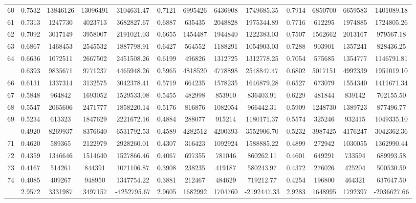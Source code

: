 \documentclass[
  12pt,
]{article}
\begin{document}
\begin{longtable}[t]{lcccccccccccc}
60 & 0.7532 & 13846126 & 13096491 & 3104631.47 & 0.7121 & 6995426 & 6436908 & 1749685.35 & 0.7914 & 6850700 & 6659583 & 1401089.18\\
61 & 0.7313 & 1247730 & 4023713 & 3682827.67 & 0.6887 & 635435 & 2048828 & 1975344.89 & 0.7716 & 612295 & 1974885 & 1724805.26\\
62 & 0.7092 & 3017149 & 3958007 & 2191021.03 & 0.6655 & 1454487 & 1944840 & 1222383.03 & 0.7507 & 1562662 & 2013167 & 979567.18\\
63 & 0.6867 & 1468453 & 2545532 & 1887798.91 & 0.6427 & 564552 & 1188291 & 1054903.03 & 0.7288 & 903901 & 1357241 & 828436.25\\
64 & 0.6636 & 1072511 & 2667502 & 2451508.26 & 0.6199 & 496826 & 1312725 & 1312778.25 & 0.7054 & 575685 & 1354777 & 1146791.81\\
\addlinespace
65 & 0.6393 & 9835671 & 9771237 & 4465948.26 & 0.5965 & 4818520 & 4778898 & 2548847.47 & 0.6802 & 5017151 & 4992339 & 1951019.10\\
66 & 0.6131 & 1337314 & 3132575 & 3042378.41 & 0.5719 & 664235 & 1578235 & 1646879.28 & 0.6527 & 673079 & 1554340 & 1411671.34\\
67 & 0.5848 & 964842 & 1693052 & 1529533.08 & 0.5455 & 482998 & 853910 & 836403.91 & 0.6229 & 481844 & 839142 & 702155.50\\
68 & 0.5547 & 2065606 & 2471777 & 1858220.14 & 0.5176 & 816876 & 1082054 & 966442.31 & 0.5909 & 1248730 & 1389723 & 877496.77\\
69 & 0.5234 & 613323 & 1847629 & 2221672.16 & 0.4884 & 288077 & 915214 & 1180171.37 & 0.5574 & 325246 & 932415 & 1049335.10\\
\addlinespace
70 & 0.4920 & 8269937 & 8376640 & 6531792.53 & 0.4589 & 4282512 & 4200393 & 3552906.70 & 0.5232 & 3987425 & 4176247 & 3042362.36\\
71 & 0.4620 & 589365 & 2122979 & 2928260.01 & 0.4307 & 316423 & 1092924 & 1588885.22 & 0.4899 & 272942 & 1030055 & 1362990.44\\
72 & 0.4359 & 1346646 & 1514640 & 1527866.46 & 0.4067 & 697355 & 781046 & 860262.11 & 0.4601 & 649291 & 733594 & 689993.58\\
73 & 0.4167 & 514261 & 844391 & 1071106.87 & 0.3908 & 238235 & 419187 & 580243.97 & 0.4372 & 276026 & 425204 & 500530.59\\
74 & 0.4085 & 409267 & 948950 & 1347754.22 & 0.3881 & 212467 & 484629 & 719212.77 & 0.4254 & 196800 & 464321 & 637647.50\\
\addlinespace
75 & 2.9572 & 3331987 & 3497157 & -4252795.67 & 2.9605 & 1682992 & 1704760 & -2192447.33 & 2.9283 & 1648995 & 1792397 & -2036627.66\\*
\end{longtable}
\endgroup{}
\end{document}
